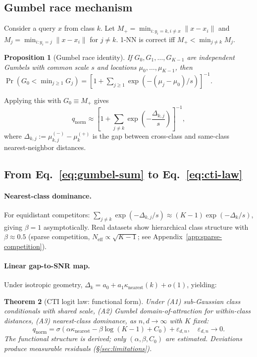 \documentclass{article}
\newtheorem{theorem}{Theorem}
\newtheorem{proposition}[theorem]{Proposition}
\begin{document}
\subsection{Gumbel race mechanism}
Consider a query $x$ from class $k$. Let
$M_+=\min_{i:y_i=k,i\neq x}\|x-x_i\|$ and
$M_j=\min_{i:y_i=j}\|x-x_i\|$ for $j\neq k$.
1-NN is correct iff $M_+<\min_{j\neq k}M_j$.

\begin{proposition}[Gumbel race identity]
If $G_0,G_1,\dots,G_{K-1}$ are independent Gumbels with common scale $s$ and locations $\mu_0,\dots,\mu_{K-1}$, then
$\Pr(G_0<\min_{j\ge1}G_j)=[1+\sum_{j\ge1}\exp(-(\mu_j-\mu_0)/s)]^{-1}$.
\end{proposition}

Applying this with $G_0\equiv M_+$ gives
\begin{equation}
\label{eq:gumbel-sum}
q_{\mathrm{norm}}
\approx
\left[
1+\sum_{j\neq k}\exp\!\left(-\frac{\Delta_{k,j}}{s}\right)
\right]^{-1},
\end{equation}
where $\Delta_{k,j}:=\mu_{k,j}^{(-)}-\mu_k^{(+)}$ is the gap between cross-class and same-class nearest-neighbor distances.

\subsection{From Eq.~\ref{eq:gumbel-sum} to Eq.~\ref{eq:cti-law}}

\paragraph{Nearest-class dominance.}
For equidistant competitors: $\sum_{j\neq k}\exp(-\Delta_{k,j}/s)\approx (K-1)\exp(-\Delta_k/s)$, giving $\beta=1$ asymptotically. Real datasets show hierarchical class structure with $\beta\approx 0.5$ (sparse competition, $N_\mathrm{eff}\propto\sqrt{K-1}$; see Appendix~\ref{app:sparse-competition}).

\paragraph{Linear gap-to-SNR map.}
Under isotropic geometry, $\Delta_k = a_0+a_1\kappa_{\mathrm{nearest}}(k)+o(1)$, yielding:

\begin{theorem}[CTI logit law: functional form]
\label{thm:cti}
Under (A1) sub-Gaussian class conditionals with shared scale, (A2) Gumbel domain-of-attraction for within-class distances, (A3) nearest-class dominance, as $n,d\to\infty$ with $K$ fixed:
\[
q_{\mathrm{norm}}
=\sigma\!\left(\alpha\kappa_{\mathrm{nearest}}-\beta\log(K-1)+C_0\right)+\varepsilon_{d,n},
\quad \varepsilon_{d,n}\to0.
\]
The functional structure is derived; only $(\alpha,\beta,C_0)$ are estimated. Deviations produce measurable residuals (\S\ref{sec:limitations}).
\end{theorem}
\end{document}
